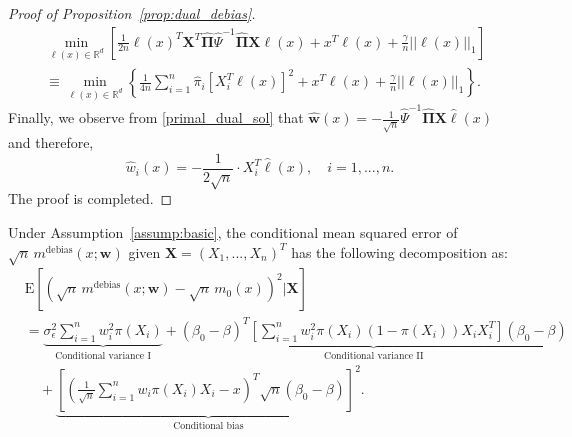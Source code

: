 \documentclass[ejsv2,noshowframe]{imsart}
\theoremstyle{plain}
\theoremstyle{definition}
\theoremstyle{remark}
\newcommand{\norm}[1]{\left|\left| #1 \right|\right|}
\renewcommand{\hat}{\widehat}
\newenvironment{customprop}[1]
{\renewcommand\theinnercustomprop{#1}\innercustomprop}
{\endinnercustomprop}
\begin{document}
\begin{proof}[Proof of Proposition~\ref{prop:dual_debias}]
	\begin{align*}
		&\min_{\ell(x) \in \mathbb{R}^d} \left[\frac{1}{2n} \ell(x)^T \bm{X}^T \hat{\bm{\Pi}} \hat{\Psi}^{-1} \hat{\bm{\Pi}}\bm{X} \ell(x) + x^T\ell(x) + \frac{\gamma}{n}\norm{\ell(x)}_1 \right] \\
		&\equiv \min_{\ell(x) \in \mathbb{R}^d} \left\{\frac{1}{4n} \sum_{i=1}^n \hat{\pi}_i\left[X_i^T \ell(x)\right]^2 + x^T\ell(x) + \frac{\gamma}{n}\norm{\ell(x)}_1 \right\}.
	\end{align*}
	Finally, we observe from \eqref{primal_dual_sol} that $\hat{\bm{w}}(x) = -\frac{1}{\sqrt{n}} \hat{\Psi}^{-1} \hat{\bm{\Pi}}\bm{X} \hat{\ell}(x)$ and therefore,
	$$\hat{w}_i(x) = -\frac{1}{2\sqrt{n}} \cdot X_i^T\hat{\ell}(x), \quad i=1,...,n.$$
	The proof is completed.
\end{proof}

\vspace{3mm}

\begin{customprop}{2.2}
	Under Assumption~\ref{assump:basic}, the conditional mean squared error of $\sqrt{n}\,m^{\mathrm{debias}}(x;\bm{w})$ given $\bm{X}=(X_1,...,X_n)^T$ has the following decomposition as:
	\begin{align*}
		&\mathrm{E}\left[\left(\sqrt{n}\,m^{\mathrm{debias}}(x;\bm{w}) - \sqrt{n}\, m_0(x) \right)^2 \Big| \bm{X} \right] \\
		&= \underbrace{\sigma_{\epsilon}^2\sum_{i=1}^n w_i^2 \pi(X_i)}_{\text{Conditional variance I}} + \underbrace{\left(\beta_0 - \beta\right)^T \left[\sum_{i=1}^n w_i^2\pi(X_i)\left(1-\pi(X_i)\right)X_iX_i^T \right] \left(\beta_0 - \beta\right)}_{\text{Conditional variance II}} \\
		&\quad + \underbrace{\left[\left(\frac{1}{\sqrt{n}}\sum_{i=1}^n w_i \pi(X_i) X_i -x \right)^T \sqrt{n}\left(\beta_0 - \beta\right) \right]^2}_{\text{Conditional bias}}.
	\end{align*}
\end{customprop}
\end{document}
